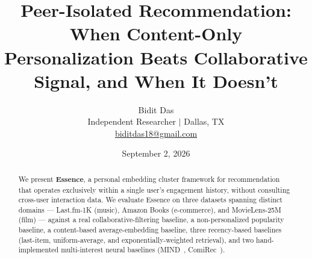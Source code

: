 \documentclass[11pt,a4paper]{article}
\title{
    \Large\textbf{Peer-Isolated Recommendation: When Content-Only}\\[4pt]
    \Large\textbf{Personalization Beats Collaborative Signal, and When It Doesn't}
}
\author{
    Bidit Das\\
    \small Independent Researcher $\mid$ Dallas, TX\\
    \small \href{mailto:biditdas18@gmail.com}{biditdas18@gmail.com}
}
\date{September 2, 2026}
\begin{document}
\maketitle

\begin{abstract}
We present \textbf{Essence}, a personal embedding cluster framework for
recommendation that operates exclusively within a single user's engagement
history, without consulting cross-user interaction data. We evaluate
Essence on three datasets spanning distinct domains --- Last.fm-1K (music),
Amazon Books (e-commerce), and MovieLens-25M (film) --- against a real
collaborative-filtering baseline, a non-personalized popularity baseline, a
content-based average-embedding baseline, three recency-based baselines
(last-item, uniform-average, and exponentially-weighted retrieval), and two
hand-implemented multi-interest neural baselines (MIND~\cite{li2019},
ComiRec~\cite{cen2020}).


\end{abstract}
\end{document}
